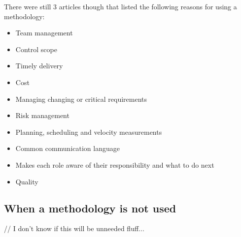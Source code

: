 There were still 3 articles though that listed the following reasons for using a methodology:
\begin{itemize}
    \item Team management \cite{lucena_2008}
    \item Control scope \cite{lucena_2008}
    \item Timely delivery \cite{lucena_2008, garg_2015}
    \item Cost \cite{lucena_2008, uzturk_2013, garg_2015}
    \item Managing changing or critical requirements \cite{lucena_2008, uzturk_2013}
    \item Risk management \cite{lucena_2008, uzturk_2013, garg_2015}
    \item Planning, scheduling and velocity measurements \cite{uzturk_2013}
    \item Common communication language \cite{uzturk_2013}
    \item Makes each role aware of their responsibility and what to do next \cite{uzturk_2013}
    \item Quality \cite{garg_2015}
\end{itemize}

\subsection{When a methodology is not used}
// I don't know if this will be unneeded fluff...
